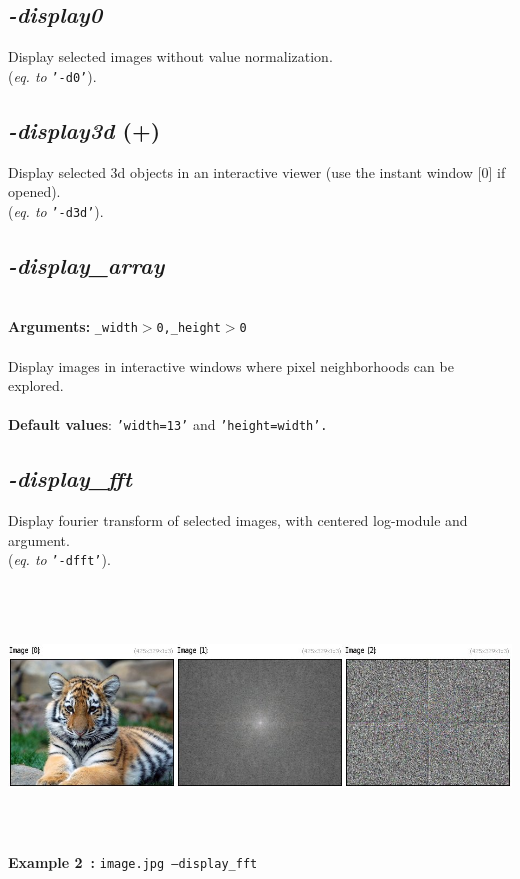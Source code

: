 \documentclass[a4paper,11pt,twoside]{book}
\begin{document}
\subsection{\emph{-display0} }\vspace*{-0.5em}
Display selected images without value normalization.
~\\(\emph{eq. to} {\small \texttt{'-d0'}}).


\subsection{\emph{-display3d} (+)}\vspace*{-0.5em}
Display selected 3d objects in an interactive viewer (use the instant window [0] if opened).
~\\(\emph{eq. to} {\small \texttt{'-d3d'}}).


\subsection{\emph{-display\_array} }\vspace*{-0.5em}
~\\\textbf{Arguments: } 
{\small \texttt{\_width$>$0,\_height$>$0}}\\~\\
Display images in interactive windows where pixel neighborhoods can be explored.
~\\~\\\textbf{Default values}: {\small \texttt{'width=13'} and \texttt{'height=width'.}}


\subsection{\emph{-display\_fft} }\vspace*{-0.5em}
Display fourier transform of selected images, with centered log-module and argument.
~\\(\emph{eq. to} {\small \texttt{'-dfft'}}).
\begin{center}\includegraphics[keepaspectratio=true,height=7cm,width=\textwidth]{img/gmic_def2.jpg}\\
{\footnotesize \textbf{Example 2~:} \texttt{image.jpg --display\_fft}}
\end{center}
\end{document}
